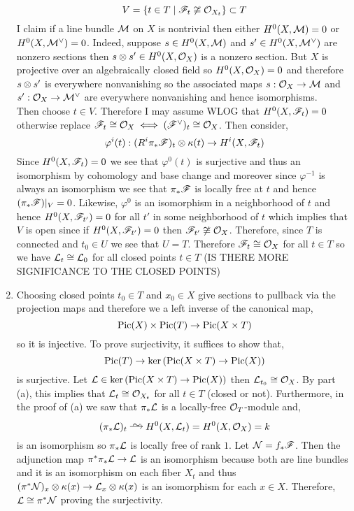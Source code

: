 \documentclass[12pt]{article}
\begin{document}
\begin{enumerate}
\[ V = \{ t \in T \mid \mathscr{F}_t \not\cong \mathcal{O}_{X_t} \} \subset T \]
I claim if a line bundle $\mathcal{M}$ on $X$ is nontrivial then either $H^0(X, \mathcal{M}) = 0$ or $H^0(X, \mathcal{M}^\vee) = 0$. Indeed, suppose $s \in H^0(X, \mathcal{M})$ and $s' \in H^0(X, \mathcal{M}^\vee)$ are nonzero sections then $s \otimes s' \in H^0(X, \mathcal{O}_{X})$ is a nonzero section. But $X$ is projective over an algebraically closed field so $H^0(X, \mathcal{O}_{X}) = 0$ and therefore $s \otimes s'$ is everywhere nonvanishing so the associated maps $s : \mathcal{O}_{X} \to \mathcal{M}$ and $s' : \mathcal{O}_{X} \to \mathcal{M}^\vee$ are everywhere nonvanishing and hence isomorphisms.
\bigskip\\
Then choose $t \in V$. Therefore I may assume WLOG that $H^0(X, \mathscr{F}_t) = 0$ otherwise replace $\mathscr{F}_t \cong \mathcal{O}_{X} \iff (\mathscr{F}^\vee)_t \cong \mathcal{O}_{X}$. Then consider, 
\[ \varphi^i(t) : (R^i \pi_* \mathscr{F})_t \otimes \kappa(t) \to H^i(X, \mathscr{F}_t)  \]
Since $H^0(X, \mathscr{F}_t) = 0$ we see that $\varphi^0(t)$ is surjective and thus an isomorphism by cohomology and base change and moreover since $\varphi^{-1}$ is always an isomorphism we see that $\pi_* \mathscr{F}$ is locally free at $t$ and hence $(\pi_* \mathscr{F})|_V = 0$. Likewise, $\varphi^0$ is an isomorphism in a neighborhood of $t$ and hence $H^0(X, \mathscr{F}_{t'}) = 0$ for all $t'$ in some neighborhood of $t$ which implies that $V$ is open since if $H^0(X, \mathscr{F}_{t'}) = 0$ then $\mathscr{F}_{t'} \not\cong \mathcal{O}_{X}$. Therefore, since $T$ is connected and $t_0 \in U$ we see that $U = T$. Therefore $\mathscr{F}_t \cong \mathcal{O}_{X}$ for all $t \in T$ so we have $\mathcal{L}_t \cong \mathcal{L}_0$ for all closed points $t \in T$ (IS THERE MORE SIGNIFICANCE TO THE CLOSED POINTS)

\item Choosing closed points $t_0 \in T$ and $x_0 \in X$ give sections to pullback via the projection maps and therefore we a left inverse of the canonical map,
\[ \mathrm{Pic}(X) \times \mathrm{Pic}(T) \to \mathrm{Pic}(X \times T) \]
so it is injective. To prove surjectivity, it suffices to show that,
\[ \mathrm{Pic}(T) \to \ker{(\mathrm{Pic}(X \times T) \to \mathrm{Pic}(X))} \]
is surjective. Let $\mathcal{L} \in \ker{(\mathrm{Pic}(X \times T) \to \mathrm{Pic}(X))}$ then $\mathcal{L}_{t_0} \cong \mathcal{O}_{X}$. By part (a), this implies that $\mathcal{L}_t \cong \mathcal{O}_{X_t}$ for all $t \in T$ (closed or not). Furthermore, in the proof of (a) we saw that $\pi_* \mathcal{L}$ is a locally-free $\mathcal{O}_{T}$-module and,
\[ (\pi_* \L)_t \iso H^0(X, \L_t) = H^0(X, \struct{X}) = k \]
is an isomorphism so $\pi_* \mathcal{L}$ is locally free of rank $1$. Let $\mathcal{N} = f_* \mathscr{F}$. Then the adjunction map $\pi^* \pi_* \mathcal{L} \to \mathcal{L}$ is an isomorphism because both are line bundles and it is an isomorphism on each fiber $X_t$ and thus $(\pi^* \mathcal{N})_x \otimes \kappa(x) \to \mathcal{L}_x \otimes \kappa(x)$ is an isomorphism for each $x \in X$. Therefore, $\mathcal{L} \cong \pi^* \mathcal{N}$ proving the surjectivity. 
\end{enumerate}
\end{document}
